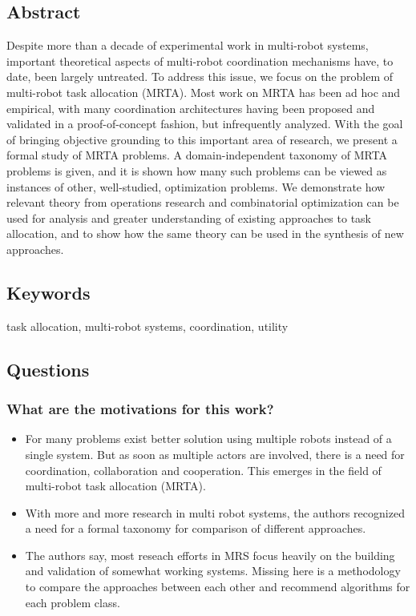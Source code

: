 \documentclass{article}
\begin{document}
\subsection*{Abstract}
Despite more than a decade of experimental work in multi-robot
systems, important theoretical aspects of multi-robot coordination
mechanisms have, to date, been largely untreated. To address this
issue, we focus on the problem of multi-robot task allocation (MRTA).
Most work on MRTA has been ad hoc and empirical, with many
coordination architectures having been proposed and validated in a
proof-of-concept fashion, but infrequently analyzed. With the goal of
bringing objective grounding to this important area of research, we
present a formal study of MRTA problems. A domain-independent
taxonomy of MRTA problems is given, and it is shown how many
such problems can be viewed as instances of other, well-studied,
optimization problems. We demonstrate how relevant theory from
operations research and combinatorial optimization can be used for
analysis and greater understanding of existing approaches to task
allocation, and to show how the same theory can be used in the
synthesis of new approaches.

\subsection*{Keywords}
task allocation, multi-robot systems, coordination, utility


\subsection*{Questions}
\subsubsection*{What are the motivations for this work?}
\begin{itemize}
    \item For many problems exist better solution using multiple robots instead of a single system. But as soon as multiple actors are involved, there is a need for coordination, collaboration and cooperation. This emerges in the field of multi-robot task allocation (MRTA).
    \item With more and more research in multi robot systems, the authors recognized a need for a formal taxonomy for comparison of different approaches. 
    \item The authors say, most reseach efforts in MRS focus heavily on the building and validation of somewhat working systems. Missing here is a methodology to compare the approaches between each other and recommend algorithms for each problem class.
\end{itemize}
\end{document}
